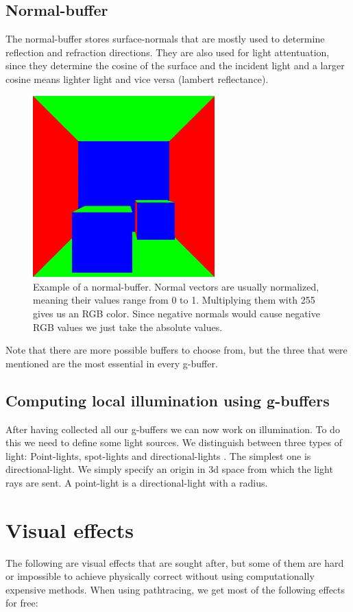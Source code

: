 \documentclass{ACGSeminar}
\begin{document}
	\subsection{Normal-buffer}
		The normal-buffer stores surface-normals that are mostly used to determine reflection and refraction directions. They are also used for light attentuation, since they determine the cosine of the surface and the incident light and a larger cosine means lighter light and vice versa (lambert reflectance).
		\begin{figure}[htb!]%
			\begin{center}%
				\includegraphics[width=7cm]{img/normal_buffer.png}
			\end{center}%
			\caption{Example of a normal-buffer. Normal vectors are usually normalized, meaning their values range from 0 to 1. Multiplying them with 255 gives us an RGB color. Since negative normals
			would cause negative RGB values we just take the absolute values.}%
			\label{fig:normal_buffer}%
		\end{figure}%
		Note that there are more possible buffers to choose from, but the three that were mentioned are the most essential in every g-buffer.
	\subsection{Computing local illumination using g-buffers}
		After having collected all our g-buffers we can now work on illumination. To do this we need to define some light sources. We distinguish between three types of light:
		Point-lights, spot-lights and directional-lights \cite{DST}. The simplest one is directional-light. We simply specify an origin in 3d space from which the light rays are sent. A point-light is a directional-light with a radius. %

\section{Visual effects} \label{visual_effects}
	The following are visual effects that are sought after, but some of them are hard or impossible to achieve physically correct without using
	computationally expensive methods. When using pathtracing, we get most of the following effects for free: 
\end{document}
